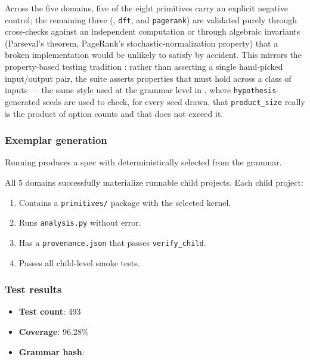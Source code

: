 \documentclass[
]{article}
\providecommand{\tightlist}{%
  \setlength{\itemsep}{0pt}\setlength{\parskip}{0pt}}
\begin{document}
Across the five domains, five of the eight primitives carry an explicit
negative control; the remaining three (,
\texttt{dft}, and \texttt{pagerank}) are validated purely through
cross-checks against an independent computation or through algebraic
invariants (Parseval's theorem, PageRank's stochastic-normalization
property) that a broken implementation would be unlikely to satisfy by
accident. This mirrors the property-based testing tradition
\citep{claessen2000quickcheck, maciver2019hypothesis}: rather than
asserting a single hand-picked input/output pair, the suite asserts
properties that must hold across a class of inputs --- the same style
used at the grammar level in
, where
\texttt{hypothesis}-generated seeds are used to check, for every seed
drawn, that \texttt{product\_size} really is the product of option
counts and that  does not exceed it.

\subsubsection{Exemplar generation}\label{exemplar-generation}

Running
produces a spec with  deterministically
selected from the grammar.

All 5 domains successfully materialize runnable child projects. Each
child project:

\begin{enumerate}
\def\labelenumi{\arabic{enumi}.}
\tightlist
\item
  Contains a \texttt{primitives/} package with the selected kernel.
\item
  Runs \texttt{analysis.py} without error.
\item
  Has a \texttt{provenance.json} that passes \texttt{verify\_child}.
\item
  Passes all child-level smoke tests.
\end{enumerate}

\subsubsection{Test results}\label{test-results}

\begin{itemize}
\tightlist
\item
  \textbf{Test count}: 493
\item
  \textbf{Coverage}: 96.28\%
\item
  \textbf{Grammar hash}: 
\end{itemize}
\end{document}
